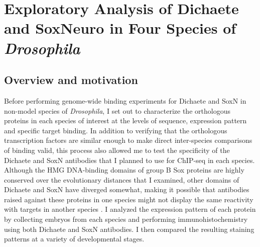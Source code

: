 \chapter{Exploratory Analysis of Dichaete and SoxNeuro in Four Species of \emph{Drosophila}}

\hrulefill

\section{Overview and motivation}

Before performing genome-wide binding experiments for Dichaete and SoxN in non-model species of \emph{Drosophila}, I set out to characterize the orthologous proteins in each species of interest at the levels of sequence, expression pattern and specific target binding. In addition to verifying that the orthologous transcription factors are similar enough to make direct inter-species comparisons of binding valid, this process also allowed me to test the specificity of the Dichaete and SoxN antibodies that I planned to use for ChIP-seq in each species. Although the HMG DNA-binding domains of group B Sox proteins are highly conserved over the evolutionary distances that I examined, other domains of Dichaete and SoxN have diverged somewhat, making it possible that antibodies raised against these proteins in one species might not display the same reactivity with targets in another species \citep{mckimmie_conserved_2005}. I analyzed the expression pattern of each protein by collecting embryos from each species and performing immunohistochemistry using both Dichaete and SoxN antibodies. I then compared the resulting staining patterns at a variety of developmental stages.

